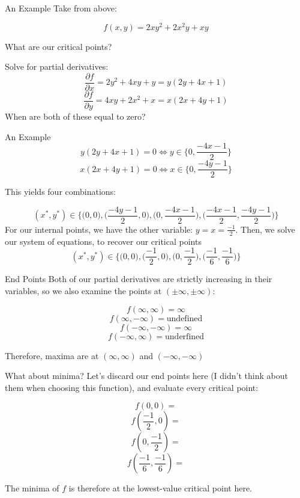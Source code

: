 \documentclass[10pt]{beamer}
\begin{document}
\begin{frame}{An Example}
    Take from above:

    \[f(x,y) = 2xy^2 + 2x^2y + xy\]

    What are our critical points? \\ \pause

    \vspace{.5cm}
    Solve for partial derivatives:
    \[\frac{\partial f}{\partial x} = 2y^2 + 4xy + y = y(2y + 4x + 1)\]
    \[\frac{\partial f}{\partial y} = 4xy + 2x^2 + x = x(2x + 4y + 1)\]
    When are both of these equal to zero?
\end{frame}

\begin{frame}{An Example}
    \[y(2y + 4x + 1) = 0 \iff y \in \{0,\frac{-4x-1}{2}\}\]
    \[x(2x + 4y + 1) = 0 \iff x \in \{0, \frac{-4y-1}{2}\}\]

    This yields four combinations:

    \[(x^*, y^*) \in \bigg\{\Big(0,0\Big), \Big(\frac{-4y-1}{2},0\Big), \Big(0,\frac{-4x-1}{2}\Big),\Big(\frac{-4x-1}{2}, \frac{-4y-1}{2}\Big) \bigg\}\]
    For our internal points, we have the other variable: $y = x = \frac{-1}{2}$. Then, we solve our system of equations, to recover our critical points
    \[(x^*, y^*) \in \bigg\{\Big(0,0\Big), \Big(\frac{-1}{2},0\Big), \Big(0,\frac{-1}{2}\Big),\Big(\frac{-1}{6}, \frac{-1}{6}\Big) \bigg\}\]
\end{frame}

\begin{frame}{End Points}
    Both of our partial derivatives are strictly increasing in their variables, so we also examine the points at $(\pm \infty, \pm \infty)$:

    \[f(\infty, \infty) = \infty\]
    \[f(\infty, -\infty) = \text{undefined}\]
    \[f(-\infty,-\infty) = \infty\]
    \[f(-\infty, \infty) = \text{underfined}\]

    Therefore, maxima are at $(\infty, \infty)$ and $(-\infty, -\infty)$
\end{frame}

\begin{frame}{What about minima?}
    Let's discard our end points here (I didn't think about them when choosing this function), and evaluate every critical point:

    \[f(0,0) =\]
    \[f(\frac{-1}{2},0) =\]
    \[f(0, \frac{-1}{2}) =\]
    \[f(\frac{-1}{6},\frac{-1}{6}) = \]

    The minima of $f$ is therefore at the lowest-value critical point here.
\end{frame}
\end{document}
